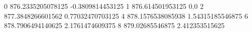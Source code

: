 0 876.2335205078125 -0.3809814453125
1 876.614501953125 0.0
2 877.3848266601562 0.77032470703125
4 878.1576538085938 1.54315185546875
6 878.7906494140625 2.1761474609375
8 879.02685546875 2.412353515625
